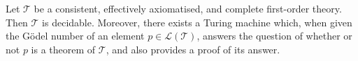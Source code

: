 Let $\mathcal{T}$ be a consistent, effectively axiomatised, and complete first-order theory. Then $\mathcal{T}$ is decidable. Moreover, there exists a Turing machine which, when given the Gödel number of an element $p \in \mathcal{L}(\mathcal{T})$, answers the question of whether or not $p$ is a theorem of $\mathcal{T}$, and also provides a proof of its answer.
